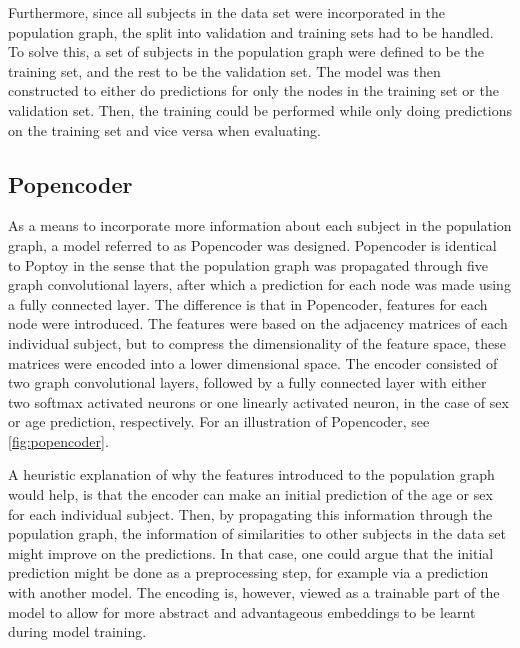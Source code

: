 Furthermore, since all subjects in the data set were incorporated in the population graph, the split into validation and training sets had to be handled. To solve this, a set of subjects in the population graph were defined to be the training set, and the rest to be the validation set. The model was then constructed to either do predictions for only the nodes in the training set or the validation set. Then, the training could be performed while only doing predictions on the training set and vice versa when evaluating. 




\subsection{Popencoder}
As a means to incorporate more information about each subject in the population graph, a model referred to as Popencoder was designed. Popencoder is identical to Poptoy in the sense that the population graph was propagated through five graph convolutional layers, after which a prediction for each node was made using a fully connected layer. The difference is that in Popencoder, features for each node were introduced. The features were based on the adjacency matrices of each individual subject, but to compress the dimensionality of the feature space, these matrices were encoded into a lower dimensional space. The encoder consisted of two graph convolutional layers, followed by a fully connected layer with either two softmax activated neurons or one linearly activated neuron, in the case of sex or age prediction, respectively. For an illustration of Popencoder, see \cref{fig:popencoder}.

A heuristic explanation of why the features introduced to the population graph would help, is that the encoder can make an initial prediction of the age or sex for each individual subject. Then, by propagating this information through the population graph, the information of similarities to other subjects in the data set might improve on the predictions. In that case, one could argue that the initial prediction might be done as a preprocessing step, for example via a prediction with another model. The encoding is, however, viewed as a trainable part of the model to allow for more abstract and advantageous embeddings to be learnt during model training. 



